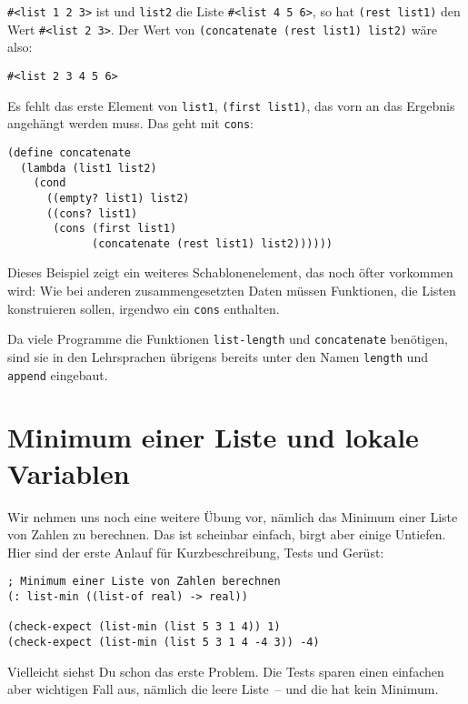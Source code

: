 \lstinline{#<list 1 2 3>} ist und \lstinline{list2} die Liste
\lstinline{#<list 4 5 6>}, so hat \lstinline{(rest list1)} den Wert \lstinline{#<list 2 3>}.
Der Wert von \lstinline{(concatenate (rest list1) list2)} wäre
also:
%
\begin{lstlisting}
#<list 2 3 4 5 6>
\end{lstlisting}
%
Es fehlt das erste Element von \lstinline{list1}, \lstinline{(first list1)}, 
das vorn an das Ergebnis angehängt werden muss.  Das geht
mit \lstinline{cons}:
%
\begin{lstlisting}
(define concatenate
  (lambda (list1 list2)
    (cond
      ((empty? list1) list2)
      ((cons? list1) 
       (cons (first list1)
             (concatenate (rest list1) list2))))))
\end{lstlisting}
%
Dieses Beispiel zeigt ein weiteres Schablonenelement, das noch öfter
vorkommen wird:  Wie bei anderen zusammengesetzten Daten müssen Funktionen, die
Listen konstruieren sollen, irgendwo ein \lstinline{cons} enthalten.

Da viele Programme die Funktionen \lstinline{list-length} und
\lstinline{concatenate} benötigen,
sind sie in den Lehrsprachen  übrigens bereits unter den Namen
\lstinline{length} und
\lstinline{append} eingebaut.


\section{Minimum einer Liste und lokale Variablen}
\label{sec:list-min}

%
Wir nehmen uns noch eine weitere Übung vor, nämlich das Minimum einer
Liste von Zahlen zu berechnen.  Das ist scheinbar einfach, birgt aber
einige Untiefen.  Hier sind der erste Anlauf für Kurzbeschreibung,
Tests und Gerüst:
%
\begin{lstlisting}
; Minimum einer Liste von Zahlen berechnen
(: list-min ((list-of real) -> real))

(check-expect (list-min (list 5 3 1 4)) 1)
(check-expect (list-min (list 5 3 1 4 -4 3)) -4)
\end{lstlisting}
%
Vielleicht siehst Du schon das erste Problem.  Die Tests sparen einen
einfachen aber wichtigen Fall aus, nämlich die leere Liste~-- und die
hat kein Minimum.

